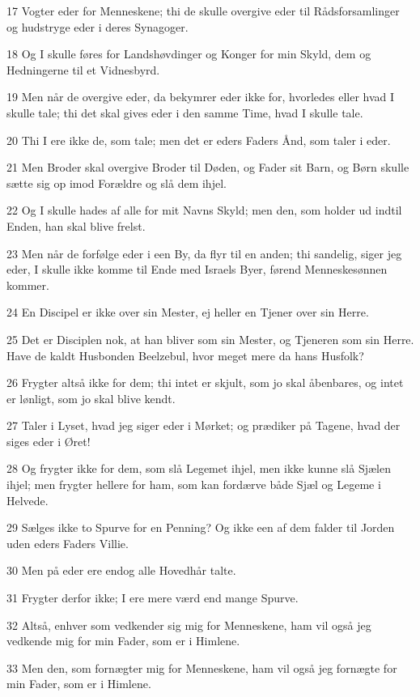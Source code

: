 \par 17 Vogter eder for Menneskene; thi de skulle overgive eder til Rådsforsamlinger og hudstryge eder i deres Synagoger.
\par 18 Og I skulle føres for Landshøvdinger og Konger for min Skyld, dem og Hedningerne til et Vidnesbyrd.
\par 19 Men når de overgive eder, da bekymrer eder ikke for, hvorledes eller hvad I skulle tale; thi det skal gives eder i den samme Time, hvad I skulle tale.
\par 20 Thi I ere ikke de, som tale; men det er eders Faders Ånd, som taler i eder.
\par 21 Men Broder skal overgive Broder til Døden, og Fader sit Barn, og Børn skulle sætte sig op imod Forældre og slå dem ihjel.
\par 22 Og I skulle hades af alle for mit Navns Skyld; men den, som holder ud indtil Enden, han skal blive frelst.
\par 23 Men når de forfølge eder i een By, da flyr til en anden; thi sandelig, siger jeg eder, I skulle ikke komme til Ende med Israels Byer, førend Menneskesønnen kommer.
\par 24 En Discipel er ikke over sin Mester, ej heller en Tjener over sin Herre.
\par 25 Det er Disciplen nok, at han bliver som sin Mester, og Tjeneren som sin Herre. Have de kaldt Husbonden Beelzebul, hvor meget mere da hans Husfolk?
\par 26 Frygter altså ikke for dem; thi intet er skjult, som jo skal åbenbares, og intet er lønligt, som jo skal blive kendt.
\par 27 Taler i Lyset, hvad jeg siger eder i Mørket; og prædiker på Tagene, hvad der siges eder i Øret!
\par 28 Og frygter ikke for dem, som slå Legemet ihjel, men ikke kunne slå Sjælen ihjel; men frygter hellere for ham, som kan fordærve både Sjæl og Legeme i Helvede.
\par 29 Sælges ikke to Spurve for en Penning? Og ikke een af dem falder til Jorden uden eders Faders Villie.
\par 30 Men på eder ere endog alle Hovedhår talte.
\par 31 Frygter derfor ikke; I ere mere værd end mange Spurve.
\par 32 Altså, enhver som vedkender sig mig for Menneskene, ham vil også jeg vedkende mig for min Fader, som er i Himlene.
\par 33 Men den, som fornægter mig for Menneskene, ham vil også jeg fornægte for min Fader, som er i Himlene.
